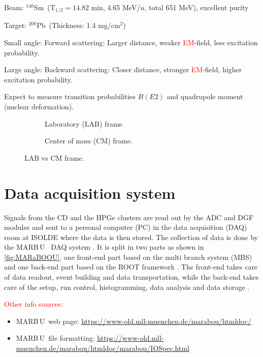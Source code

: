 \documentclass[twoside,english]{uiofysmaster/uiofysmaster}
\newcommand{\Sm}{$^{140}$Sm} %
\newcommand{\Pb}{$^{208}$Pb}
\newcommand{\MBOU}{MAR\belowbaseline[-2pt]{a}B\stackinset{l}{3pt}{b}{-3pt}{O}{O}\,U}
\begin{document}
Beam: \Sm\ (T$_{1/2} = 14.82$ min, 4.65 MeV/$u$, total 651 MeV), excellent purity

Target: \Pb\ (Thickness: 1.4 mg/cm$^2$)


Small angle: Forward scattering: Larger distance, weaker \textcolor{red}{EM}-field, less excitation probability.

Large angle: Backward scattering: Closer distance, stronger \textcolor{red}{EM}-field, higher excitation probability. \newline


\bigskip

Expect to measure transition probabilities $B(E2)$ and quadrupole moment (nuclear deformation). 

\bigskip


\begin{figure}
	\centering
	\begin{subfigure}{\textwidth}
		
		\caption{Laboratory (LAB) frame}
		\label{fig:LAB}
	\end{subfigure}
	\begin{subfigure}{\textwidth}
		
		\caption{Center of mass (CM) frame.}
		\label{fig:CM}
	\end{subfigure}
	\caption{LAB vs CM frame.}
	\label{fig:LAB-CM}
\end{figure}


\section{Data acquisition system}
Signals from the CD and the HPGe clusters are read out by the ADC and DGF modules and sent to a personal computer (PC) in the data acquisition (DAQ) room at ISOLDE where the data is then stored. The collection of data is done by the \MBOU\ \cite{Maraboou} DAQ system \cite{MB-spect}. It is split in two parts as shown in \autoref{fig:MARaBOOU}, one front-end part based on the multi branch system (MBS) \cite{MBS} and one back-end part based on the ROOT framework \cite{ROOT}. The front-end takes care of data readout, event building and data transportation, while the back-end takes care of the setup, run control, histogramming, data analysis and data storage \cite{MB-spect}.


\textcolor{red}{Other info sources:}
\begin{itemize}
	\item \MBOU\ web page: \url{https://www-old.mll-muenchen.de/marabou/htmldoc/}
	\item \MBOU\ file formatting: \url{https://www-old.mll-muenchen.de/marabou/htmldoc/marabou/IOSpec.html}
\end{itemize}
\end{document}
